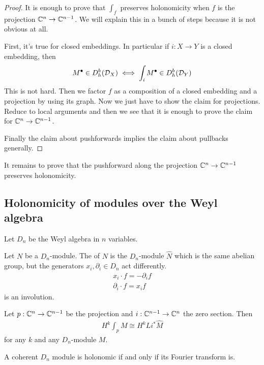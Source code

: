 \begin{proof}
	It is enough to prove that $\int_f$ preserves holonomicity when $f$ is the projection $\mathbb{C}^n\to \mathbb{C}^{n-1}$. We will explain this
	in a bunch of steps because it is not obvious at all.

	\hfill

	First, it's true for closed embeddings. In particular if $i:X\to Y$ is a closed embedding, then
	\begin{align*}
		M^\bullet\in D^b_h({\mathcal{D}}_X) \iff \int_i M^\bullet \in D^b_h({\mathcal{D}}_Y)
	\end{align*} This is not hard. Then we factor $f$ as a composition of a closed embedding and a projection by using
	its graph. Now we just have to show the claim for projections. Reduce to local arguments and
	then we see that it is enough to prove the claim for $\mathbb{C}^n\to \mathbb{C}^{n-1}$.

	\hfill

	Finally the claim about pushforwards implies the claim about pullbacks generally.
\end{proof}

It remains to prove that the pushforward along the projection $\mathbb{C}^n\to \mathbb{C}^{n-1}$ preserves holonomicity.

\subsection{Holonomicity of modules over the Weyl algebra}
Let $D_n$ be the Weyl algebra in $n$ variables.
\begin{definition}
	Let $N$ be a $D_n$-module. The  of $N$ is the $D_n$-module $\hat N$ which is the same abelian group,
	but the generators $x_i,\partial_i \in D_n$ act differently.
	\begin{align*}
		x_i \cdot f = -\partial_i f \\
		\partial_i \cdot f = x_i f
	\end{align*} is an involution.
\end{definition}
\begin{proposition}
	Let $p:\mathbb{C}^n\to \mathbb{C}^{n-1}$ be the projection and $i:\mathbb{C}^{n-1}\to \mathbb{C}^n$ the zero section. Then \begin{align*}
		H^k\int_p M \cong H^k Li^*\hat{M}
	\end{align*}
	for any $k$ and any $D_n$-module $M$.
\end{proposition}

\begin{proposition}\label{prop:fourier_transform_holonomic}
	A coherent $D_n$ module is holonomic if and only if its Fourier transform is.
\end{proposition}

